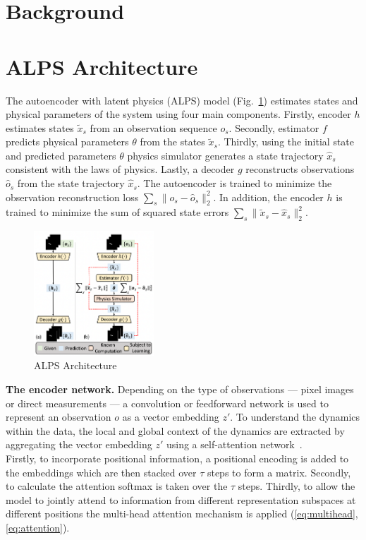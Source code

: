 \documentclass[acmtog]{techreportacmart}
\begin{document}
\section{Background} %
\section{ALPS Architecture}
The autoencoder with latent physics (ALPS) model (Fig.~\ref{fig:architecture}) estimates states and physical parameters of the system using four main components. Firstly, encoder ${h}$ estimates states $\tilde{x}_{s}$ from an observation sequence ${o_s}$. Secondly, estimator ${f}$ predicts physical parameters ${\theta}$  from the states $\tilde{x}_{s}$. Thirdly, using the initial state and predicted parameters ${\theta}$ physics simulator generates a state trajectory $\hat{x}_{s}$ consistent with the laws of physics. Lastly, a decoder ${g}$ reconstructs observations $\hat{o}_{s}$ from the state trajectory $\hat{x}_{s}$. The autoencoder is trained to minimize the observation reconstruction loss $\sum_{s} \lVert o_{s} - \hat{o}_{s} \rVert_{2}^{2}$. In addition, the encoder ${h}$ is trained to minimize the sum of squared state errors $\sum_{s} \lVert \tilde{x}_{s} - \hat{x}_{s} \rVert_{2}^{2}$.
\begin{figure}
  \centering
  \includegraphics[width=0.4\textwidth]{architecture}
  \caption{ALPS Architecture}
  \label{fig:architecture}
\end{figure}
\textbf{The encoder network.} Depending on the type of observations — pixel images or direct measurements — a convolution or feedforward network is used to represent an observation ${o}$ as a vector embedding ${z'}$. To understand the dynamics within the data, the local and global context of the dynamics are extracted by aggregating the vector embedding ${z'}$ using a self-attention network~\cite{NIPS2017_3f5ee243}.
\\
Firstly, to incorporate positional information, a positional encoding is added to the embeddings which are then stacked over ${\tau}$ steps to form a matrix. Secondly, to calculate the attention softmax is taken over the ${\tau}$ steps. Thirdly, to allow the model to jointly attend to information from different representation subspaces at different positions the multi-head attention mechanism is applied (\ref{eq:multihead},\ref{eq:attention}).
\end{document}

